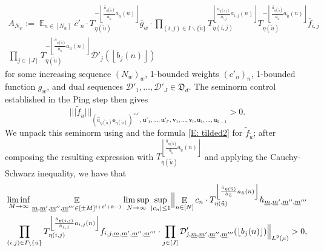 \documentclass[11pt]{amsart}
\theoremstyle{definition}
\DeclareMathOperator*{\E}{\mathbb{E}}
\newcommand{\CD}{{\mathcal D}}
\newcommand{\be}{{\mathbf{e}}}
\newcommand{\bu}{{\mathbf{u}}}
\newcommand{\bv}{{\mathbf{v}}}
\newcommand{\um}{{\underline{m}}}
\newcommand{\nnorm}[1]{\lvert\!|\!| #1|\!|\!\rvert}
\newcommand{\1}{{\mathbf{1}}}
\newcommand{\floor}[1]{{\left \lfloor #1 \right \rfloor}}
\begin{document}
\begin{multline}\label{E: tilded2}
    A_{N_{w}}:=\E_{n\in[N_{w}]} \overline{c}'_{n}\cdot T_{\eta(\tilde{u})}^{-\floor{\frac{\hat{a}_{\eta(\tilde{u})}}{\hat{a}_{\tilde{u}}}a_{\tilde{u}}(n)}}\overline{g}_{w}\cdot\prod_{(i,j)\in I\backslash\{\tilde{u}\}}T_{\eta(i,j)}^{\floor{\frac{\hat{a}_{\eta(i,j)}}{\hat{a}_{i,j}}a_{i,j}(n)}}T_{\eta(\tilde{u})}^{-\floor{\frac{\hat{a}_{\eta(\tilde{u})}}{\hat{a}_{\tilde{u}}}a_{\tilde{u}}(n)}}\overline{f}_{i,j}
        \\
       \prod_{j\in [J]}T_{\eta(\tilde{u})}^{-\floor{\frac{\hat{a}_{\eta(\tilde{u})}}{\hat{a}_{\tilde{u}}}a_{\tilde{u}}(n)}}\overline{\mathcal{D}}'_{j}(\floor{b_{j}(n)})
\end{multline}
     for some increasing sequence $(N_{w})_{w}$, 1-bounded weights $(c'_{n})_n$, 1-bounded function $g_{w}$, and dual sequences $\mathcal{D}'_{1},\dots,\mathcal{D}'_{J}\in\mathfrak{D}_{d}$.
    The seminorm control established in the Ping step then gives $$\nnorm{\tilde{f}_{\tilde{u}}}_{(\hat{a}_{\eta(\tilde{u})}\be_{\eta(\tilde{u})})^{\times s'},\bu'_{1},\dots,\bu'_{t'},\bv_{1},\dots,\bv_{t},\bu_{1},\dots,\bu_{k-1}}>0.$$
      We unpack this seminorm using \cite[Lemma 11.11]{DKKST24} and the formula \eqref{E: tilded2} for $\tilde{f}_{\tilde{u}}$; after composing the resulting expression with $T_{\eta(\tilde{u})}^{\floor{\frac{\hat{a}_{\eta(\tilde{u})}}{\hat{a}_{\tilde{u}}}a_{\tilde{u}}(n)}}$ and applying the Cauchy-Schwarz inequality, we have that 
\begin{multline*}
    \liminf_{M\to\infty}\E_{\um, \um',\um'',\um'''\in [\pm M]^{t+t'+k-1}}\limsup_{N\to\infty} \sup_{|c_n|\leq 1}\Bigl\Vert
  \E_{n\in[N]}c_n\cdot T_{\eta(\tilde{u})}^{\floor{\frac{\hat{a}_{\eta(\tilde{u})}}{\hat{a}_{\tilde{u}}}a_{\tilde{u}}(n)}} h_{\um,\um',\um'',\um'''}
   \\
   \prod_{(i,j)\in I\backslash\{\tilde{u}\}}T_{\eta(i,j)}^{\floor{\frac{\hat{a}_{\eta(i,j)}}{\hat{a}_{i,j}}a_{i,j}(n)}}f_{i,j,\um,\um',\um'',\um'''}\cdot
   \prod_{j\in[J]} \CD'_{j,\um,\um',\um'',\um'''}(\floor{b_j(n)})\Bigr\Vert_{L^2(\mu)} > 0,
\end{multline*}
\end{document}
